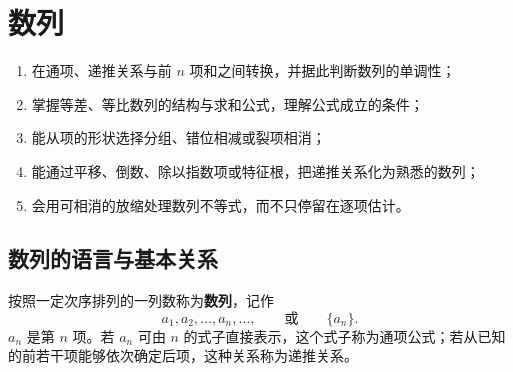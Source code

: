 \chapter{数列}
\label{chap:sequences}

\begin{learninggoals}
  \begin{enumerate}
    \item 在通项、递推关系与前 $n$ 项和之间转换，并据此判断数列的单调性；
    \item 掌握等差、等比数列的结构与求和公式，理解公式成立的条件；
    \item 能从项的形状选择分组、错位相减或裂项相消；
    \item 能通过平移、倒数、除以指数项或特征根，把递推关系化为熟悉的数列；
    \item 会用可相消的放缩处理数列不等式，而不只停留在逐项估计。
  \end{enumerate}
\end{learninggoals}

\section{数列的语言与基本关系}

\begin{definitionbox}[数列、通项与递推关系]
  按照一定次序排列的一列数称为\textbf{数列}，记作
  \[
    a_1,a_2,\ldots,a_n,\ldots,
    \qquad\text{或}\qquad \{a_n\}.
  \]
  $a_n$ 是第 $n$ 项。若 $a_n$ 可由 $n$ 的式子直接表示，这个式子称为通项公式；若从已知的前若干项能够依次确定后项，这种关系称为递推关系。
\end{definitionbox}

